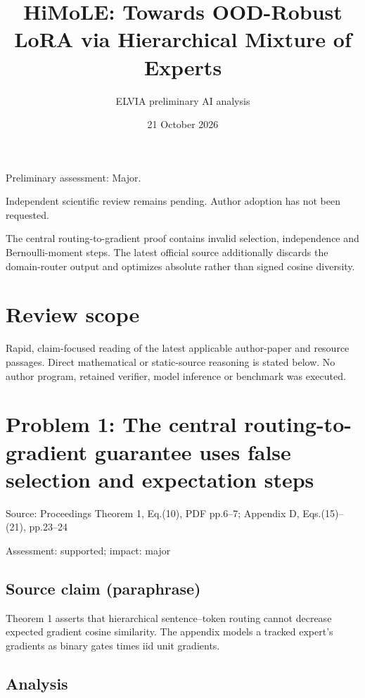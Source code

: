 \documentclass[11pt]{article}
\begin{document}
\title{HiMoLE: Towards OOD-Robust LoRA via Hierarchical Mixture of Experts}

\author{ELVIA preliminary AI analysis}\date{21 October 2026}\maketitle

Preliminary assessment: Major.\par

Independent scientific review remains pending. Author adoption has not been requested.

The central routing-to-gradient proof contains invalid selection, independence and Bernoulli-moment steps. The latest official source additionally discards the domain-router output and optimizes absolute rather than signed cosine diversity.

\section*{Review scope}

Rapid, claim-focused reading of the latest applicable author-paper and resource passages. Direct mathematical or static-source reasoning is stated below. No author program, retained verifier, model inference or benchmark was executed.

\section*{Problem 1: The central routing-to-gradient guarantee uses false selection and expectation steps}

Source: Proceedings Theorem 1, Eq.(10), PDF pp.6–7; Appendix D, Eqs.(15)–(21), pp.23–24

Assessment: supported; impact: major

\subsection*{Source claim (paraphrase)}

Theorem 1 asserts that hierarchical sentence–token routing cannot decrease expected gradient cosine similarity. The appendix models a tracked expert’s gradients as binary gates times iid unit gradients.

\subsection*{Analysis}
\end{document}
